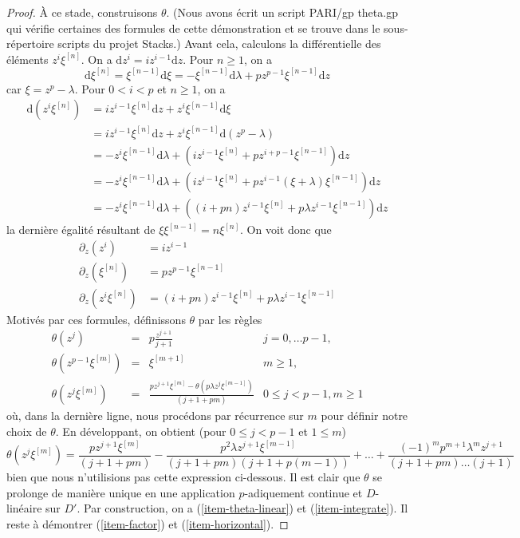 \begin{proof}
\medskip\noindent
À ce stade, construisons $\theta$. (Nous avons écrit un script PARI/gp theta.gp
qui vérifie certaines des formules de cette démonstration et se trouve dans le
sous-répertoire scripts du projet Stacks.) Avant cela, calculons
la différentielle des éléments $z^i \xi^{[n]}$. On a
$\text{d}z^i = i z^{i - 1} \text{d}z$. Pour $n \geq 1$, on a
$$
\text{d}\xi^{[n]} =
\xi^{[n - 1]} \text{d}\xi =
- \xi^{[n - 1]}\text{d}\lambda + p z^{p - 1} \xi^{[n - 1]}\text{d}z
$$
car $\xi = z^p - \lambda$. Pour $0 < i < p$ et $n \geq 1$, on a
\begin{align*}
\text{d}(z^i\xi^{[n]})
& =
iz^{i - 1}\xi^{[n]}\text{d}z + z^i\xi^{[n - 1]}\text{d}\xi \\
& =
iz^{i - 1}\xi^{[n]}\text{d}z + z^i\xi^{[n - 1]}\text{d}(z^p - \lambda) \\
& =
- z^i\xi^{[n - 1]}\text{d}\lambda +
(iz^{i - 1}\xi^{[n]} + pz^{i + p - 1}\xi^{[n - 1]})\text{d}z \\
& =
- z^i\xi^{[n - 1]}\text{d}\lambda +
(iz^{i - 1}\xi^{[n]} + pz^{i - 1}(\xi + \lambda)\xi^{[n - 1]})\text{d}z \\
& =
- z^i\xi^{[n - 1]}\text{d}\lambda +
((i + pn)z^{i - 1}\xi^{[n]} + p\lambda z^{i - 1}\xi^{[n - 1]})\text{d}z
\end{align*}
la dernière égalité résultant de $\xi \xi^{[n - 1]} = n\xi^{[n]}$.
On voit donc que
\begin{align*}
\partial_z(z^i) & = i z^{i - 1} \\
\partial_z(\xi^{[n]}) & = p z^{p - 1} \xi^{[n - 1]} \\
\partial_z(z^i\xi^{[n]}) & =
(i + pn) z^{i - 1} \xi^{[n]} + p \lambda z^{i - 1}\xi^{[n - 1]}
\end{align*}
Motivés par ces formules, définissons $\theta$ par les règles
$$
\begin{matrix}
\theta(z^j)
& = & p\frac{z^{j + 1}}{j + 1}
& j = 0, \ldots p - 1, \\
\theta(z^{p - 1}\xi^{[m]})
& = & \xi^{[m + 1]}
& m \geq 1, \\
\theta(z^j \xi^{[m]})
& = &
\frac{p z^{j + 1} \xi^{[m]} - \theta(p\lambda z^j \xi^{[m - 1]})}{(j + 1 + pm)}
& 0 \leq j < p - 1, m \geq 1
\end{matrix}
$$
où, dans la dernière ligne, nous procédons par récurrence sur $m$ pour définir notre choix de
$\theta$. En développant, on obtient (pour $0 \leq j < p - 1$ et $1 \leq m$)
$$
\theta(z^j \xi^{[m]}) =
\textstyle{\frac{p z^{j + 1} \xi^{[m]}}{(j + 1 + pm)} -
\frac{p^2 \lambda z^{j + 1} \xi^{[m - 1]}}{(j + 1 + pm)(j + 1 + p(m - 1))} +
\ldots +
\frac{(-1)^m p^{m + 1} \lambda^m z^{j + 1}}
{(j + 1 + pm) \ldots (j + 1)}}
$$
bien que nous n'utilisions pas cette expression ci-dessous. Il est clair que $\theta$
se prolonge de manière unique en une application $p$-adiquement continue et $D$-linéaire sur $D'$.
Par construction, on a (\ref{item-theta-linear}) et (\ref{item-integrate}).
Il reste à démontrer (\ref{item-factor}) et (\ref{item-horizontal}).


\end{proof}
